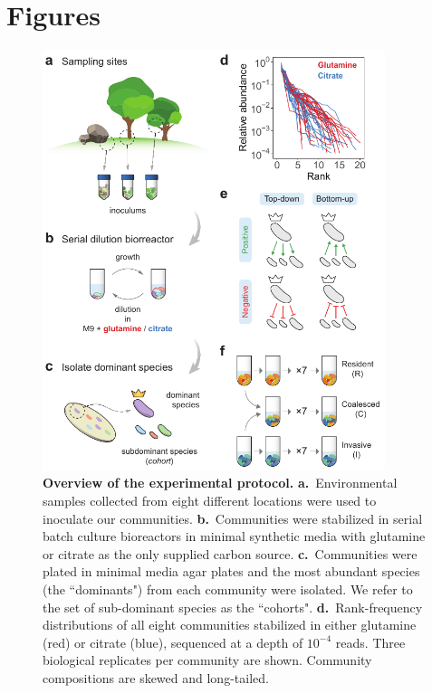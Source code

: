 \documentclass[a4paper,10pt]{article}
\begin{document}
\clearpage










\clearpage

\section*{Figures}\label{figs}

\begin{figure}[!h]
\centering
\internallinenumbers
\includegraphics[width=10cm,keepaspectratio]{figs/fig1.pdf}
\caption{\textbf{Overview of the experimental protocol.}
\textbf{a.}~Environmental samples collected from eight different locations were used
to inoculate our communities.
\textbf{b.}~Communities were stabilized in serial batch culture bioreactors
\cite{Goldford2018} in minimal synthetic media with glutamine or citrate as the
only supplied carbon source.
\textbf{c.}~Communities were plated in minimal media agar plates and the most abundant
species (the ``dominants") from each community were isolated. We refer to the set of
sub-dominant species as the ``cohorts".
\textbf{d.}~Rank-frequency distributions of all eight communities stabilized in either
glutamine (red) or citrate (blue), sequenced at a depth of $10^{-4}$ reads.
Three biological replicates per community are shown.
Community compositions are skewed and long-tailed.
}
\end{figure}
\end{document}
